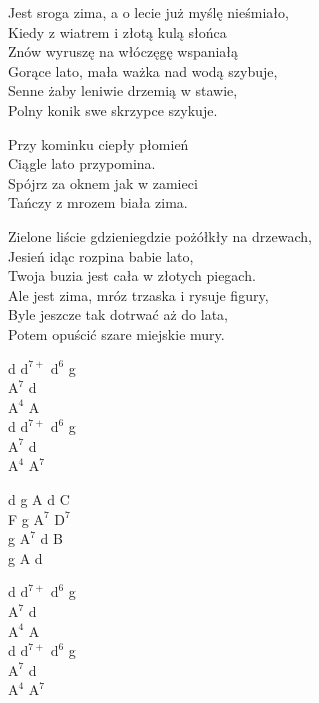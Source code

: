 \begin{text}
    Jest sroga zima, a o lecie już myślę nieśmiało,\\
    Kiedy z wiatrem i złotą kulą słońca\\
    Znów wyruszę na włóczęgę wspaniałą\\
    Gorące lato, mała ważka nad wodą szybuje,\\
    Senne żaby leniwie drzemią w stawie,\\
    Polny konik swe skrzypce szykuje.

    Przy kominku ciepły płomień\\
    Ciągle lato przypomina.\\
    Spójrz za oknem jak w zamieci\\
    Tańczy z mrozem biała zima.

    Zielone liście gdzieniegdzie pożółkły na drzewach,\\
    Jesień idąc rozpina babie lato,\\
    Twoja buzia jest cała w złotych piegach.\\
    Ale jest zima, mróz trzaska i rysuje figury,\\
    Byle jeszcze tak dotrwać aż do lata,\\
    Potem opuścić szare miejskie mury.
\end{text}
\begin{chord}
    d $\mathrm{d^{7+}}$ $\mathrm{d^{6}}$ g\\
    $\mathrm{A^{7}}$ d\\
    $\mathrm{A^{4}}$ A\\
    d $\mathrm{d^{7+}}$ $\mathrm{d^{6}}$ g\\
    $\mathrm{A^{7}}$ d\\
    $\mathrm{A^{4}}$ $\mathrm{A^{7}}$

    d g A d C\\
    F g $\mathrm{A^{7}}$ $\mathrm{D^{7}}$\\
    g $\mathrm{A^{7}}$ d B\\
    g A d

    d $\mathrm{d^{7+}}$ $\mathrm{d^{6}}$ g\\
    $\mathrm{A^{7}}$ d\\
    $\mathrm{A^{4}}$ A\\
    d $\mathrm{d^{7+}}$ $\mathrm{d^{6}}$ g\\
    $\mathrm{A^{7}}$ d\\
    $\mathrm{A^{4}}$ $\mathrm{A^{7}}$
\end{chord}
